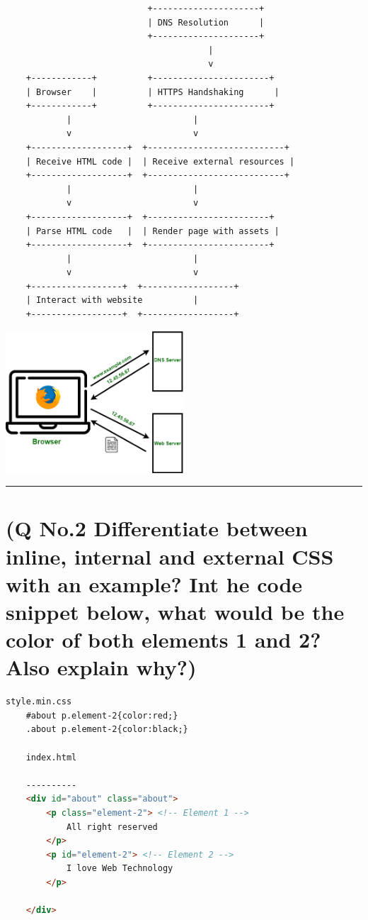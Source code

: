 \documentclass[11pt]{article}
\begin{document}
\begin{lstlisting}
                            +---------------------+
                            | DNS Resolution      |
                            +---------------------+
                                        |
                                        v
    +------------+          +-----------------------+
    | Browser    |          | HTTPS Handshaking      |
    +------------+          +-----------------------+
            |                        |
            v                        v
    +-------------------+  +---------------------------+
    | Receive HTML code |  | Receive external resources |
    +-------------------+  +---------------------------+
            |                        |
            v                        v
    +-------------------+  +------------------------+
    | Parse HTML code   |  | Render page with assets |
    +-------------------+  +------------------------+
            |                        |
            v                        v
    +------------------+  +------------------+
    | Interact with website          |
    +------------------+  +------------------+

\end{lstlisting}

\includegraphics[width=0.5\textwidth]{resources/qno1a.png}


\noindent\rule{\linewidth}{0.4pt}
\section{(Q No.2 Differentiate between inline, internal and external CSS with an example? Int he code snippet below, what would be the color of both elements 1 and 2? Also explain why?) }
\begin{lstlisting}[language=html]
    style.min.css
    #about p.element-2{color:red;}
    .about p.element-2{color:black;}

    index.html

    ----------
    <div id="about" class="about">
        <p class="element-2"> <!-- Element 1 -->
            All right reserved
        </p>
        <p id="element-2"> <!-- Element 2 -->
            I love Web Technology
        </p>

    </div>
\end{lstlisting}
\subparagraph{}
\end{document}
